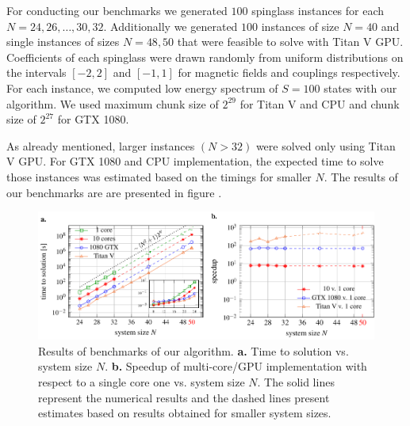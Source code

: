For conducting our benchmarks we generated $100$ spinglass instances for each $N=24, 26, \ldots, 30, 32$. Additionally we generated $100$ instances of size $N=40$ and single instances of sizes $N=48, 50$ that were feasible to solve with Titan V GPU. Coefficients of each spinglass were drawn randomly from uniform distributions on the intervals $[-2, 2]$ and $[-1, 1]$ for magnetic fields and couplings respectively. For each instance, we computed low energy spectrum of $S=100$ states with our algorithm. We used maximum chunk size of $2^{29}$ for Titan V and CPU and chunk size of $2^{27}$ for GTX 1080.

As already mentioned, larger instances $(N > 32)$ were solved only using Titan V GPU. For GTX 1080 and CPU implementation, the expected time to solve those instances was estimated based on the timings for smaller $N$. The results of our benchmarks are are presented in figure .

\begin{figure}
    \centering
    \includegraphics[width=\textwidth]{figures/resultsplot_reduced.pdf}
    \caption{Results of benchmarks of our algorithm. {\textbf{a.}} Time to solution vs. system size $N$. {\textbf{b.}} Speedup of multi-core/GPU implementation with respect to a single core one vs. system size $N$. The solid lines represent the numerical results and the dashed lines present estimates based on results obtained for smaller system sizes.}
    \label{fig:benchmark_results}
\end{figure}
